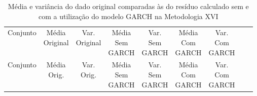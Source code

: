 \clearpage

\begin{center}
\begin{longtable}{ccccccccc}
\toprule
\rowcolor{white}
\caption[Metodologia XVI: dados estatísticos]{Média e variância do dado original
comparadas às do resíduo calculado sem e com a utilização do modelo GARCH na
Metodologia XVI} \label{tab:DadosEstatisticosMet16}\\
\midrule
    Conjunto & \specialcell{Média\\Original} &
    \specialcell{Var.\\Original} & \specialcell{Média\\Sem\\GARCH} &
    \specialcell{Var.\\Sem\\GARCH} & \specialcell{Média\\Com\\GARCH}&
    \specialcell{Var.\\Com\\GARCH} \\

\midrule
\endfirsthead 
\midrule
\rowcolor{white}
    Conjunto & \specialcell{Média\\Orig.} &
    \specialcell{Var.\\Orig.} & \specialcell{Média\\Sem\\GARCH} &
    \specialcell{Var.\\Sem\\GARCH} & \specialcell{Média\\Com\\GARCH}&
    \specialcell{Var.\\Com\\GARCH} \\


\end{longtable}
\end{center}

